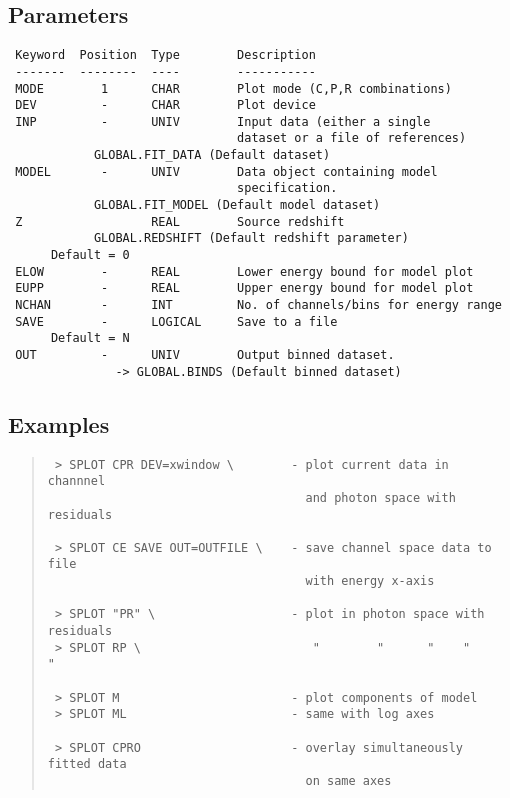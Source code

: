 \documentclass{book}
\renewcommand{\_}{{\tt\char'137}}     %
\begin{document}
\subsection{Parameters}
\begin{verbatim}
 Keyword  Position  Type        Description
 -------  --------  ----        -----------
 MODE        1      CHAR        Plot mode (C,P,R combinations)
 DEV         -      CHAR        Plot device
 INP         -      UNIV        Input data (either a single
                                dataset or a file of references)
            GLOBAL.FIT_DATA (Default dataset)
 MODEL       -      UNIV        Data object containing model
                                specification.
            GLOBAL.FIT_MODEL (Default model dataset)
 Z                  REAL        Source redshift
            GLOBAL.REDSHIFT (Default redshift parameter)
      Default = 0
 ELOW        -      REAL        Lower energy bound for model plot
 EUPP        -      REAL        Upper energy bound for model plot
 NCHAN       -      INT         No. of channels/bins for energy range
 SAVE        -      LOGICAL     Save to a file
      Default = N
 OUT         -      UNIV        Output binned dataset.
               -> GLOBAL.BINDS (Default binned dataset)
\end{verbatim}\subsection{Examples}
\begin{quote}\begin{verbatim}
 > SPLOT CPR DEV=xwindow \        - plot current data in channnel
                                    and photon space with residuals
 
 > SPLOT CE SAVE OUT=OUTFILE \    - save channel space data to file
                                    with energy x-axis
 
 > SPLOT "PR" \                   - plot in photon space with residuals
 > SPLOT RP \                        "        "      "    "       "
 
 > SPLOT M                        - plot components of model
 > SPLOT ML                       - same with log axes
 
 > SPLOT CPRO                     - overlay simultaneously fitted data
                                    on same axes
\end{verbatim}\end{quote}
\end{document}
